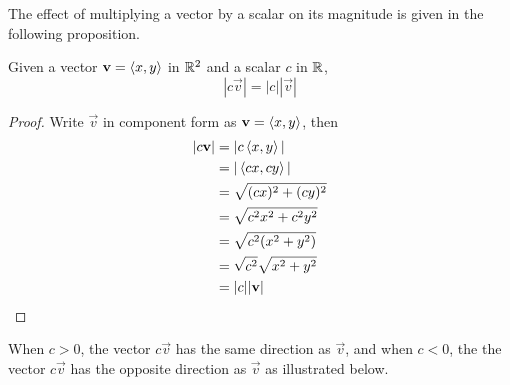 \documentclass[handout]{ximera}
\begin{document}
The effect of multiplying a vector by a scalar on its magnitude is given in the following proposition.
\begin{proposition}
Given a vector $\mathbf{v} = \left\langle x,y\right\rangle$ in $\mathbb R^2$ and a scalar $c$ in $\mathbb R$,
\[
|c\vec{v}| = |c| |\vec{v}|
\]
\begin{proof}
Write $\vec{v}$ in component form as $\mathbf{v} = \left\langle x,y\right\rangle$, then
\begin{align*}
|c\mathbf{v}| &= |c\left\langle x,y\right\rangle|\\
            &= |\left\langle cx,cy\right\rangle|\\
            &= \sqrt{(cx)^2 + (cy)^2}\\
            &= \sqrt{c^2x^2 + c^2y^2}\\
            &= \sqrt{c^2(x^2 + y^2)}\\
            &= \sqrt{c^2} \sqrt{x^2 + y^2}\\
            &= |c| |\mathbf{v}|
\end{align*}
\end{proof}
\end{proposition}

When $c>0$, the vector $c\vec{v}$ has the same direction as $\vec{v}$, and when $c<0$, the
the vector $c\vec{v}$ has the opposite direction as $\vec{v}$ as illustrated below.



\begin{image}
\end{image}
\end{document}
